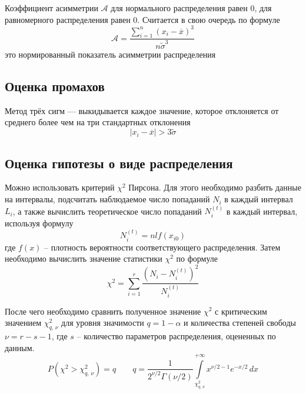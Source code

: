 \documentclass[12pt,a4paper]{article}
\begin{document}
Коэффициент асимметрии $\mathcal{A}$ для нормального распределения равен $0$, для равномерного распределения 
равен $0$. Считается в свою очередь по формуле
\begin{equation}
  \mathcal{A} = \frac{\displaystyle\sum_{i=1}^{n} (x_i - \overline{x})^3}{n\tilde{\sigma}^3}
  \tag{1.10}
\end{equation}
это нормированный показатель асимметрии распределения

\subsection{Оценка промахов}

Метод трёх сигм — выкидывается каждое значение, которое отклоняется от среднего более чем на три стандартных отклонения
\begin{equation}
|x_i - \overline{x}| > 3\tilde{\sigma}
\tag{2}
\label{3sigma}
\end{equation}

\subsection{Оценка гипотезы о виде распределения}

Можно использовать критерий $\chi^2$ Пирсона. Для этого необходимо разбить данные на интервалы, подсчитать наблюдаемое число попаданий $N_i$ в каждый интервал $L_i$, а также вычислить теоретическое число попаданий $N_i^{(t)}$ в каждый интервал, используя формулу
\begin{equation}
N_i^{(t)} = nlf(x_{i0})
\tag{3.1}
\end{equation}
где $f(x)$ – плотность вероятности соответствующего распределения. Затем необходимо вычислить значение статистики $\chi^2$ по формуле
\begin{equation}
\chi^2 = \sum_{i=1}^{r} \frac{\left(N_i - N_i^{(t)}\right)^2}{N_i^{(t)}}
\tag{3.2}
\end{equation}

После чего необходимо сравнить полученное значение $\chi^2$ с критическим значением 
$\chi^2_{q,\,\nu}$ для уровня значимости $q = 1 - \alpha$ и количества степеней свободы $\nu = r - s - 1$, 
где $s$ – количество параметров распределения, оцененных по данным.
\begin{equation}
  P\left(\chi^2 > \chi^2_{q,\,\nu}\right) = q 
  \qquad
  q =
  \frac{1}{2^{\nu/2}\Gamma(\nu/2)}
  \int\limits_{\chi^2_{q,\,\nu}}^{+\infty}
  x^{\nu/2 - 1} e^{-x/2}\,dx
  \tag{3.3}
  \label{chi2:critical}
\end{equation}
\end{document}
